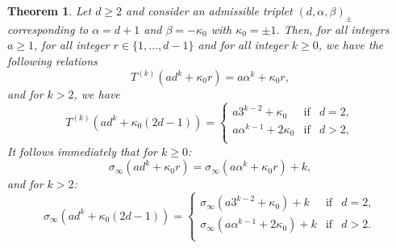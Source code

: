 \documentclass[10pt,a4paper]{amsart}
\newtheorem{theorem}{Theorem}
\begin{document}
\begin{theorem} 
	Let $d\geq 2$ and consider     an admissible  triplet  $(d,\alpha,\beta)_{\pmb{\pm}}$  corresponding to   $\alpha=d+1$ and  $\beta=-\kappa_0$  with $\kappa_0=\pm 1$. 	Then, 	for all integers $a\geq 1$, for all integer $r\in\{1,\ldots, d-1\} $ and  for all integer $k\geq 0$, we have  the following relations 
	\begin{equation}\label{T(adk+kappa0 r)-(d,d+1,1,kappa0)}
		T^{(k)}(ad^k+\kappa_0 r)=a\alpha^k+\kappa_0r,
	\end{equation} 	
	and for $k>2$, we have
	\begin{equation}\label{T(adk+kappa0 (2d-1))-(d,d+1,1,kappa0)}
		T^{(k)}(ad^k+\kappa_0 (2d-1))=\left\{\begin{array}{lll}
			a3^{k-2} +\kappa_0 &\mathrm{if}& d=2,\\
			a\alpha^{k-1}+2\kappa_0 &\mathrm{if}& d>2,\\
		\end{array}\right.
	\end{equation}
	It follows immediately  that for $k\geq 0$:
	\begin{equation}\label{sigma(adk+kappa0 r)-(d,d+1,1,kappa0)}
		\sigma_\infty(ad^k+\kappa_0 r)=\sigma_\infty(a\alpha^k+\kappa_0 r)+k,
	\end{equation} 	
	and  for $k>2$:
	\begin{equation}\label{sigma(adk+kappa0 (2d-1))-(d,d+1,1,kappa0)}
		\sigma_\infty(ad^k+\kappa_0 (2d-1))=\left\{\begin{array}{lll}
			\sigma_\infty(a3^{k-2}+\kappa_0)+k &\mathrm{if}& d=2,\\
			\sigma_\infty(a\alpha^{k-1}+2\kappa_0)+k  &\mathrm{if}& d>2.\\
		\end{array}\right.
	\end{equation}
\end{theorem}
\end{document}
